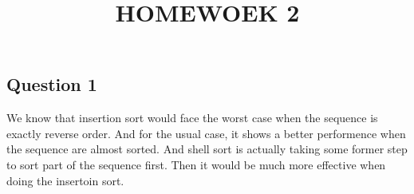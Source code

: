 \documentclass[conference]{IEEEtran}
\begin{document}
\title{HOMEWOEK 2}

\author{
}

\maketitle

\subsection*{Question 1}
We know that insertion sort would face the worst case when the sequence is 
exactly reverse order. And for the usual case, it shows a better performence
when the sequence are almost sorted. And shell sort is actually taking some 
former step to sort part of the sequence first. Then it would be much more 
effective when doing the insertoin sort.
\end{document}
